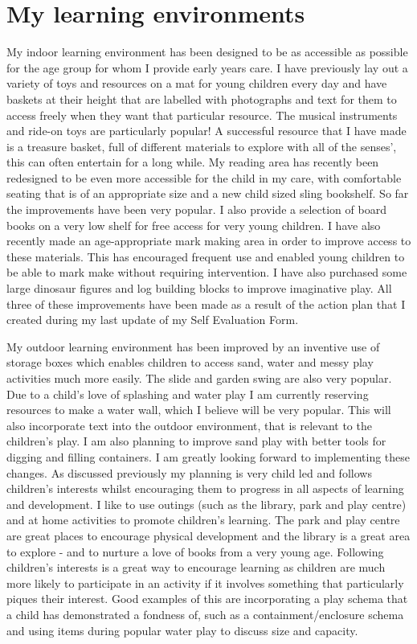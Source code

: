 \documentclass[10pt,a4paper]{report}
\begin{document}
\section{My learning environments}

My indoor learning environment has been designed to be as accessible as possible for the age group for whom I provide early years care. I have previously lay out a variety of toys and resources on a mat for young children every day and have baskets at their height that are labelled with photographs and text for them to access freely when they want that particular resource. The musical instruments and ride-on toys are particularly popular! A successful resource that I have made is a treasure basket, full of different materials to explore with all of the senses', this can often entertain for a long while. My reading area has recently been redesigned to be even more accessible for the child in my care, with comfortable seating that is of an appropriate size and a new child sized sling bookshelf. So far the improvements have been very popular. I also provide a selection of board books on a very low shelf for free access for very young children. I have also recently made an age-appropriate mark making area in order to improve access to these materials. This has encouraged frequent use and enabled young children to be able to mark make without requiring intervention. I have also purchased some large dinosaur figures and log building blocks to improve imaginative play. All three of these improvements have been made as a result of the action plan that I created during my last update of my Self Evaluation Form.

My outdoor learning environment has been improved by an inventive use of storage boxes which enables children to access sand, water and messy play activities much more easily. The slide and garden swing are also very popular. Due to a child's love of splashing and water play I am currently reserving resources to make a water wall, which I believe will be very popular. This will also incorporate text into the outdoor environment, that is relevant to the children's play. I am also planning to improve sand play with better tools for digging and filling containers. I am greatly looking forward to implementing these changes. As discussed previously my planning is very child led and follows children's interests whilst encouraging them to progress in all aspects of learning and development. I like to use outings (such as the library, park and play centre) and at home activities to promote children's learning. The park and play centre are great places to encourage physical development and the library is a great area to explore - and to nurture a love of books from a very young age. Following children's interests is a great way to encourage learning as children are much more likely to participate in an activity if it involves something that particularly piques their interest. Good examples of this are incorporating a play schema that a child has demonstrated a fondness of, such as a containment/enclosure schema and using items during popular water play to discuss size and capacity.
\end{document}
